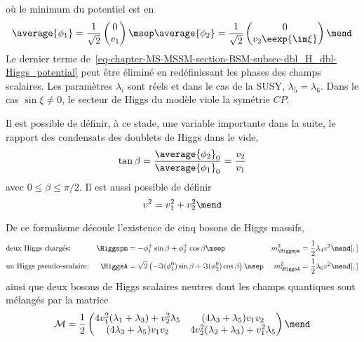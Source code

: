 où le minimum du potentiel est en
\begin{equation}
\average{\phi_1} = \frac{1}{\sqrt{2}} \begin{pmatrix}
0\\v_1
\end{pmatrix}
\msep
\average{\phi_2} = \frac{1}{\sqrt{2}} \begin{pmatrix}
0\\v_2 \eexp{\im\xi}
\end{pmatrix}
\mend
\end{equation}
Le dernier terme de~\eqref{eq-chapter-MS-MSSM-section-BSM-subsec-dbl_H_dbl-Higgs_potential} peut être éliminé en redéfinissant les phases des champs scalaires.
Les paramètres $\lambda_i$ sont réels et dans le cas de la SUSY, $\lambda_5=\lambda_6$.
Dans le cas $\sin\xi\neq0$, le secteur de Higgs du modèle viole la symétrie $CP$.
\par Il est possible de définir, à ce stade, une variable importante dans la suite, le rapport des condensats des doublets de Higgs dans le vide,
\begin{equation}
\tan\beta = \frac{\average{\phi_2}_0}{\average{\phi_1}_0} = \frac{v_2}{v_1}
\label{eq-tan_beta-2HDM}
\end{equation}
avec $0\leq\beta\leq\pi/2$.
Il est aussi possible de définir
\begin{equation}
v^2 = v_1^2+v_2^2
\mend
\end{equation}
\par De ce formalisme découle l'existence de cinq bosons de Higgs massifs,
\begin{align}
&
\text{deux Higgs chargés:}
&
\Higgspm &= - \phi_1^\pm \sin\beta + \phi_2^\pm \cos\beta
\msep&
m_{\Higgspm}^2 &= \frac{1}{2} \lambda_4 v^2
\mend[,]
\\
&
\text{un Higgs pseudo-scalaire:}
&
\HiggsA &= \sqrt{2}\left(-\Im(\phi_1^0)\sin\beta+\Im(\phi_2^0)\cos\beta\right)
\msep&
m_{\HiggsA}^2 &= \frac{1}{2} \lambda_6 v^2
\mend[,]
\end{align}
ainsi que deux bosons de Higgs scalaires neutres dont les champs quantiques sont mélangés par la matrice
\begin{equation}
\mathcal{M} = \frac{1}{2} \begin{pmatrix}
4v_1^2 (\lambda_1+\lambda_3) + v_2^2\lambda_5 & (4\lambda_3+\lambda_5)v_1v_2 \\
(4\lambda_3+\lambda_5)v_1v_2 & 4v_2^2 (\lambda_2+\lambda_3) + v_1^2\lambda_5
\end{pmatrix}
\mend
\end{equation}
